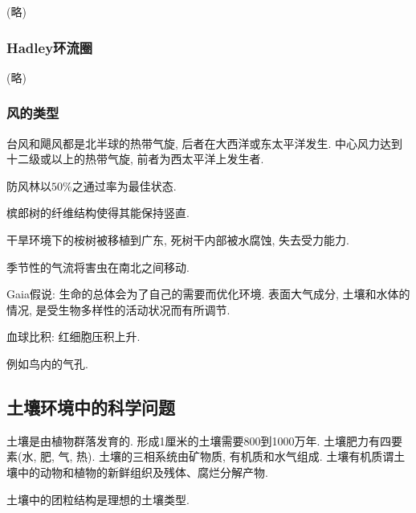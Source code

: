 \documentclass{ctexart}
\begin{document}
(略)


\subsubsection{Hadley环流圈} %
\label{ssub:hadley环流圈}

(略)


\subsubsection{风的类型} %
\label{ssub:风的类型}

台风和飓风都是北半球的热带气旋, 后者在大西洋或东太平洋发生. 中心风力达到十二级或以上的热带气旋, 前者为西太平洋上发生者.
\par
防风林以$50\%$之通过率为最佳状态.
\par
槟郎树的纤维结构使得其能保持竖直.
\begin{ex}
    干旱环境下的桉树被移植到广东, 死树干内部被水腐蚀, 失去受力能力. 
\end{ex}
\begin{ex}
    季节性的气流将害虫在南北之间移动.
\end{ex}
Gaia假说: 生命的总体会为了自己的需要而优化环境. 表面大气成分, 土壤和水体的情况, 是受生物多样性的活动状况而有所调节.
\begin{ex}[人类对高海拔的适应]
    血球比积: 红细胞压积上升.
\end{ex}
\begin{ex}[动物对低氧环境的适应]
    例如鸟内的气孔.
\end{ex}



\subsection{土壤环境中的科学问题} %
\label{sub:土壤环境中的科学问题}

土壤是由植物群落发育的. 形成1厘米的土壤需要800到1000万年.
土壤肥力有四要素(水, 肥, 气, 热).
土壤的三相系统由矿物质, 有机质和水气组成.
土壤有机质谓土壤中的动物和植物的新鲜组织及残体、腐烂分解产物.
\par
土壤中的团粒结构是理想的土壤类型.


\end{document}
